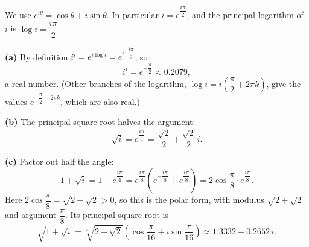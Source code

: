 We use $e^{i\theta}=\cos\theta+i\sin\theta$. In particular $i=e^{\dfrac{i\pi}{2}}$, and the principal logarithm of $i$ is $\log i=\dfrac{i\pi}{2}$.

\textbf{(a)} By definition $i^i=e^{i\log i}=e^{i\cdot\dfrac{i\pi}{2}}$, so
\[
i^i=\boxed{e^{-\dfrac{\pi}{2}}}\approx0.2079 ,
\]
a real number. (Other branches of the logarithm, $\log i=i\left(\dfrac{\pi}{2}+2\pi k\right)$, give the values $e^{-\dfrac{\pi}{2}-2\pi k}$, which are also real.)

\textbf{(b)} The principal square root halves the argument:
\[
\sqrt i=e^{\dfrac{i\pi}{4}}=\boxed{\dfrac{\sqrt2}{2}+\dfrac{\sqrt2}{2}\,i}.
\]

\textbf{(c)} Factor out half the angle:
\[
1+\sqrt i=1+e^{\dfrac{i\pi}{4}}=e^{\dfrac{i\pi}{8}}\left(e^{-\dfrac{i\pi}{8}}+e^{\dfrac{i\pi}{8}}\right)=2\cos\dfrac{\pi}{8}\cdot e^{\dfrac{i\pi}{8}}.
\]
Here $2\cos\dfrac{\pi}{8}=\sqrt{2+\sqrt2}>0$, so this is the polar form, with modulus $\sqrt{2+\sqrt2}$ and argument $\dfrac{\pi}{8}$. Its principal square root is
\[
\sqrt{1+\sqrt i}=\boxed{\sqrt[4]{2+\sqrt2}\left(\cos\dfrac{\pi}{16}+i\sin\dfrac{\pi}{16}\right)}\approx1.3332+0.2652\,i .
\]
